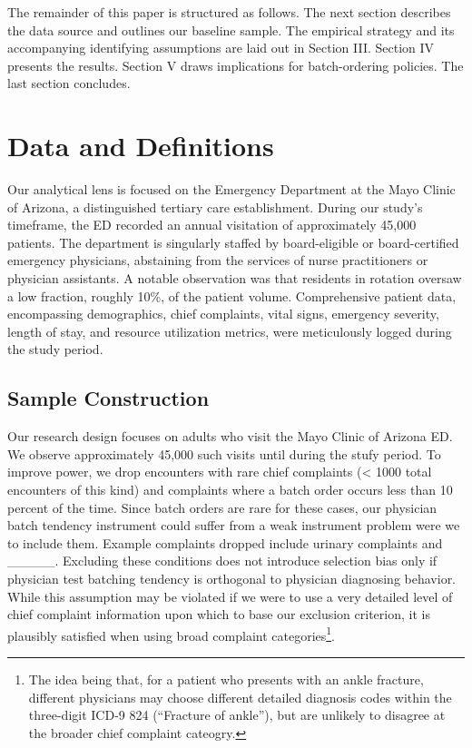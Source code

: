 \documentclass[,,nonblindrev]{informs}
\begin{document}
The remainder of this paper is structured as follows. The next section
describes the data source and outlines our baseline sample. The
empirical strategy and its accompanying identifying assumptions are laid
out in Section III. Section IV presents the results. Section V draws
implications for batch-ordering policies. The last section concludes.

\hypertarget{sec:II}{%
\section{Data and Definitions}\label{sec:II}}

Our analytical lens is focused on the Emergency Department at the Mayo
Clinic of Arizona, a distinguished tertiary care establishment. During
our study's timeframe, the ED recorded an annual visitation of
approximately 45,000 patients. The department is singularly staffed by
board-eligible or board-certified emergency physicians, abstaining from
the services of nurse practitioners or physician assistants. A notable
observation was that residents in rotation oversaw a low fraction,
roughly 10\%, of the patient volume. Comprehensive patient data,
encompassing demographics, chief complaints, vital signs, emergency
severity, length of stay, and resource utilization metrics, were
meticulously logged during the study period.

\hypertarget{sample-construction}{%
\subsection{Sample Construction}\label{sample-construction}}

Our research design focuses on adults who visit the Mayo Clinic of
Arizona ED. We observe approximately 45,000 such visits until during the
stufy period. To improve power, we drop encounters with rare chief
complaints (\textless{} 1000 total encounters of this kind) and
complaints where a batch order occurs less than 10 percent of the time.
Since batch orders are rare for these cases, our physician batch
tendency instrument could suffer from a weak instrument problem were we
to include them. Example complaints dropped include urinary complaints
and \_\_\_\_\_. Excluding these conditions does not introduce selection
bias only if physician test batching tendency is orthogonal to physician
diagnosing behavior. While this assumption may be violated if we were to
use a very detailed level of chief complaint information upon which to
base our exclusion criterion, it is plausibly satisfied when using broad
complaint
categories\footnote{The idea being that, for a patient who presents with an ankle fracture, different physicians may choose different detailed diagnosis codes within the three-digit ICD-9 824 (“Fracture of ankle”), but are unlikely to disagree at the broader chief complaint cateogry.}.
\end{document}
